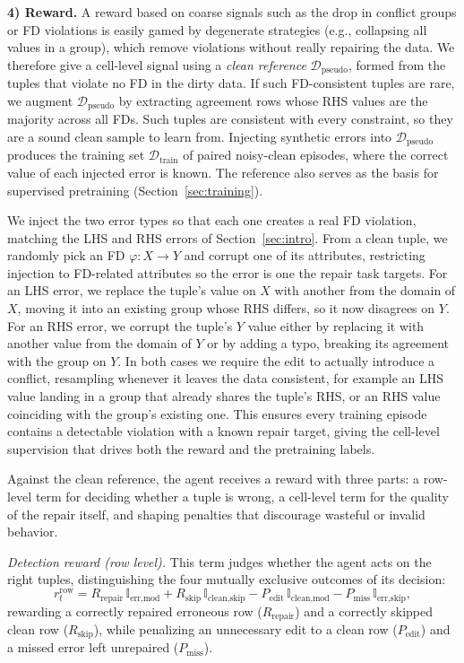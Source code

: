 \documentclass[sigconf]{acmart}
\begin{document}
\noindent\textbf{4) Reward.}
A reward based on coarse signals such as the drop in conflict groups or FD violations is easily gamed by degenerate strategies (e.g., collapsing all values in a group), which remove violations without really repairing the data. We therefore give a cell-level signal using a \emph{clean reference} $\mathcal{D}_{\text{pseudo}}$, formed from the tuples that violate no FD in the dirty data. If such FD-consistent tuples are rare, we augment $\mathcal{D}_{\text{pseudo}}$ by extracting agreement rows whose RHS values are the majority across all FDs. Such tuples are consistent with every constraint, so they are a sound clean sample to learn from. Injecting synthetic errors into $\mathcal{D}_{\text{pseudo}}$ produces the training set $\mathcal{D}_{\text{train}}$ of paired noisy-clean episodes, where the correct value of each injected error is known. The reference also serves as the basis for supervised pretraining (Section~\ref{sec:training}).

We inject the two error types so that each one creates a real FD violation, matching the LHS and RHS errors of Section~\ref{sec:intro}. From a clean tuple, we randomly pick an FD $\varphi: X \rightarrow Y$ and corrupt one of its attributes, restricting injection to FD-related attributes so the error is one the repair task targets. For an LHS error, we replace the tuple's value on $X$ with another from the domain of $X$, moving it into an existing group whose RHS differs, so it now disagrees on $Y$. For an RHS error, we corrupt the tuple's $Y$ value either by replacing it with another value from the domain of $Y$ or by adding a typo, breaking its agreement with the group on $Y$. In both cases we require the edit to actually introduce a conflict, resampling whenever it leaves the data consistent, for example an LHS value landing in a group that already shares the tuple's RHS, or an RHS value coinciding with the group's existing one. This ensures every training episode contains a detectable violation with a known repair target, giving the cell-level supervision that drives both the reward and the pretraining labels.

Against the clean reference, the agent receives a reward with three parts: a row-level term for deciding whether a tuple is wrong, a cell-level term for the quality of the repair itself, and shaping penalties that discourage wasteful or invalid behavior.

\textit{Detection reward (row level).} This term judges whether the agent acts on the right tuples, distinguishing the four mutually exclusive outcomes of its decision:
\begin{equation}
r_t^{\text{row}} = R_{\text{repair}}\,\mathbb{I}_{\text{err,mod}} + R_{\text{skip}}\,\mathbb{I}_{\text{clean,skip}} - P_{\text{edit}}\,\mathbb{I}_{\text{clean,mod}} - P_{\text{miss}}\,\mathbb{I}_{\text{err,skip}},
\end{equation}
rewarding a correctly repaired erroneous row ($R_{\text{repair}}$) and a correctly skipped clean row ($R_{\text{skip}}$), while penalizing an unnecessary edit to a clean row ($P_{\text{edit}}$) and a missed error left unrepaired ($P_{\text{miss}}$).
\end{document}
